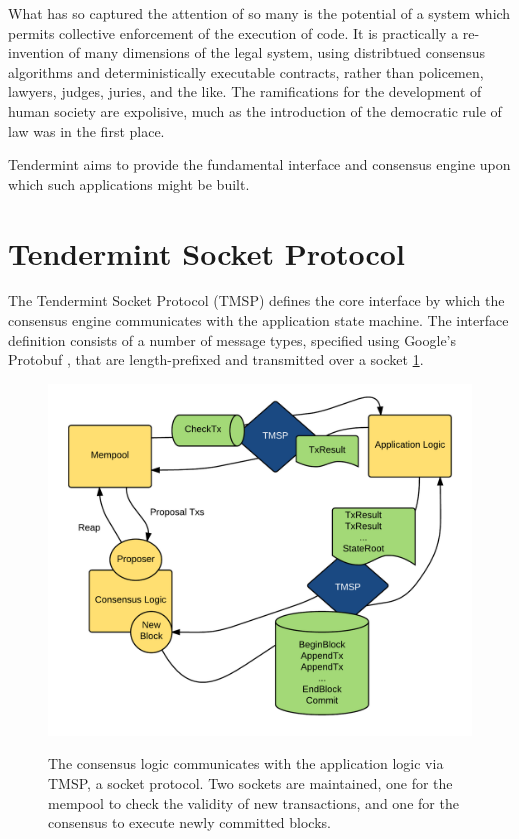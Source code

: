 What has so captured the attention of so many is the potential of a system which permits collective enforcement of the execution of code.
It is practically a re-invention of many dimensions of the legal system, using distribtued consensus algorithms and deterministically executable contracts,
rather than policemen, lawyers, judges, juries, and the like.
The ramifications for the development of human society are expolisive, much as the introduction of the democratic rule of law was in the first place.

Tendermint aims to provide the fundamental interface and consensus engine upon which such applications might be built.

\section{Tendermint Socket Protocol}

The Tendermint Socket Protocol (TMSP) defines the core interface by which the consensus engine communicates with the application state machine.
The interface definition consists of a number of message types, specified using Google's Protobuf \cite{protobuf}, 
that are length-prefixed and transmitted over a socket \ref{fig:tmsp}.

\begin{figure}[]
	\includegraphics[width=\linewidth,height=\textheight,keepaspectratio]{figures/tmsp.png}
    	\centering
	\label{fig:tmsp}
	\caption[TMSP Architecture]{
The consensus logic communicates with the application logic via TMSP, a socket protocol. 
Two sockets are maintained, one for the mempool to check the validity of new transactions,
and one for the consensus to execute newly committed blocks.
}
\end{figure}

